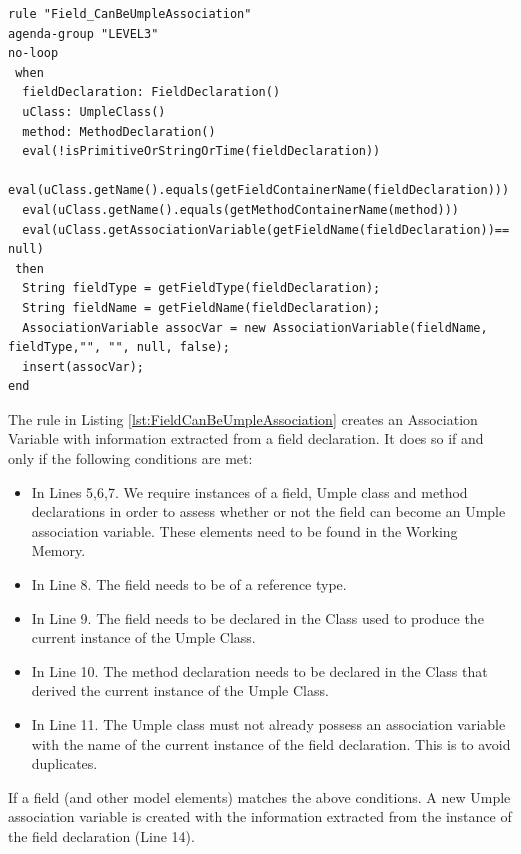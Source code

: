 \begin{lstlisting}[language={drools},label=lst:FieldCanBeUmpleAssociation, caption=Rule FieldCanBeUmpleAssociation]
rule "Field_CanBeUmpleAssociation"
agenda-group "LEVEL3" 
no-loop
 when
  fieldDeclaration: FieldDeclaration()
  uClass: UmpleClass()
  method: MethodDeclaration()
  eval(!isPrimitiveOrStringOrTime(fieldDeclaration))				   
  eval(uClass.getName().equals(getFieldContainerName(fieldDeclaration)))
  eval(uClass.getName().equals(getMethodContainerName(method)))
  eval(uClass.getAssociationVariable(getFieldName(fieldDeclaration))== null)
 then
  String fieldType = getFieldType(fieldDeclaration);
  String fieldName = getFieldName(fieldDeclaration);
  AssociationVariable assocVar = new AssociationVariable(fieldName, fieldType,"", "", null, false);
  insert(assocVar); 	
end
\end{lstlisting}

The rule in Listing \ref{lst:FieldCanBeUmpleAssociation} creates an Association Variable with information extracted from a field declaration. It does so if and only if the following conditions are met:
\begin{itemize}
\item In Lines 5,6,7. We require instances of a field, Umple class and method declarations in order to assess whether or not the field can become an Umple association variable. These elements need to be found in the Working Memory. 

\item In Line 8. The field needs to be of a reference type. 

\item In Line 9. The field needs to be declared in the Class used to produce the current instance of the Umple Class.

\item In Line 10. The method declaration needs to be declared in the Class that derived the current instance of the Umple Class.

\item In Line 11. The Umple class must not already possess an association variable with the name of the current instance of the field declaration. This is to avoid duplicates.

\end{itemize}

If a field (and other model elements) matches the above conditions. A new Umple association variable is created with the information extracted from the instance of the field declaration (Line 14).

